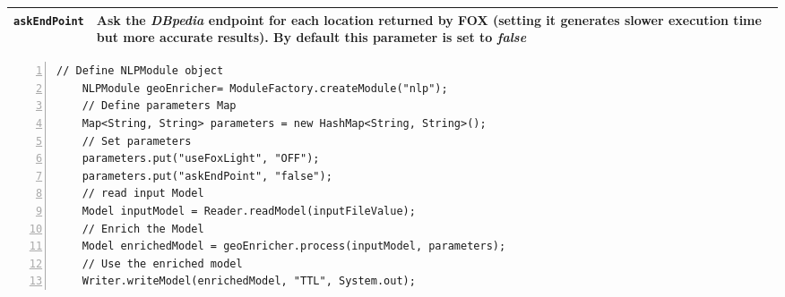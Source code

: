 \documentclass[a4paper,twoside,bibtotoc,abstracton,12pt,BCOR=15mm]{article}
\begin{document}
\begin{table}
\begin{tabularx}{\textwidth}{@{}lX@{}}
    \midrule
    \texttt{askEndPoint} 	& Ask the \emph{DBpedia} endpoint for each location returned by FOX (setting it generates slower execution time but more accurate results). By default this parameter is set to \emph{false}\\
    \midrule
    \end{tabularx}
    \end{table}

    \begin{lstlisting}[label=lst:NLPModule, float=tp, numbers=left, numberstyle=\tiny, caption = Code fragment to call the \texttt{NLPModule} class.]
    // Define NLPModule object
    NLPModule geoEnricher= ModuleFactory.createModule("nlp");
    // Define parameters Map
    Map<String, String> parameters = new HashMap<String, String>();
    // Set parameters
    parameters.put("useFoxLight", "OFF");
    parameters.put("askEndPoint", "false");
    // read input Model
    Model inputModel = Reader.readModel(inputFileValue);
    // Enrich the Model
    Model enrichedModel = geoEnricher.process(inputModel, parameters);
    // Use the enriched model
    Writer.writeModel(enrichedModel, "TTL", System.out);
    \end{lstlisting}
    
\end{document}
